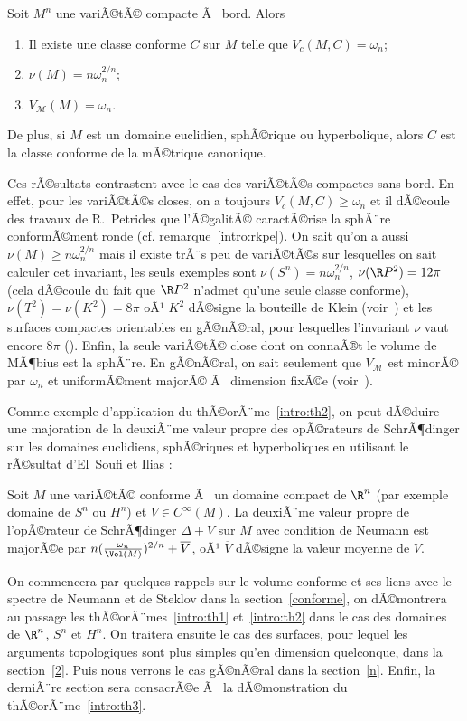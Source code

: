 \documentclass[11pt,a4paper]{smfart}
\begin{document}
\begin{theo}\label{intro:th2}
Soit $M^n$ une variÃ©tÃ© compacte Ã  bord. Alors
\begin{enumerate}
\item Il existe une classe conforme $C$ sur $M$ telle que $V_c(M,C)=\omega_n$;
\item $\nu(M)=n\omega_n^{2/n}$;
\item $V_\mathcal{M}(M)=\omega_n$.
\end{enumerate}
De plus, si $M$ est un domaine euclidien, sphÃ©rique ou hyperbolique, alors
$C$ est la classe conforme de la mÃ©trique canonique.
\end{theo}
Ces rÃ©sultats contrastent avec le cas des variÃ©tÃ©s compactes sans bord.
En effet, pour les variÃ©tÃ©s closes, on a toujours $V_c(M,C)\geq\omega_n$
et il dÃ©coule des travaux de R.~Petrides  que l'Ã©galitÃ© caractÃ©rise la sphÃ¨re
conformÃ©ment ronde (cf. remarque~\ref{intro:rkpe}).
On sait qu'on a aussi $\nu(M)\geq n\omega_n^{2/n}$ mais il existe trÃ¨s
peu de variÃ©tÃ©s sur lesquelles on sait calculer cet invariant, les
seuls exemples sont $\nu(S^n)=n\omega_n^{2/n}$, $\nu(\R P^2)=12\pi$
(cela dÃ©coule du fait que $\R P^2$ n'admet qu'une seule classe conforme),
 $\nu(T^2)=\nu(K^2)=8\pi$ oÃ¹ $K^2$ dÃ©signe la bouteille de Klein
(voir~\cite{gi09}) et les surfaces compactes orientables en gÃ©nÃ©ral, pour
lesquelles l'invariant $\nu$ vaut encore $8\pi$
(\cite{pe14}). Enfin, la seule variÃ©tÃ© close dont on connaÃ®t le
volume de MÃ¶bius est la sphÃ¨re. En gÃ©nÃ©ral, on sait seulement que
$V_\mathcal{M}$ est minorÃ© par $\omega_n$ et uniformÃ©ment majorÃ© Ã  dimension
fixÃ©e (voir~\cite{ja08}).

Comme exemple d'application du thÃ©orÃ¨me~\ref{intro:th2},
on peut dÃ©duire une majoration de la deuxiÃ¨me valeur propre des
opÃ©rateurs de SchrÃ¶dinger sur les domaines euclidiens, sphÃ©riques et
hyperboliques en utilisant le rÃ©sultat d'El~Soufi et Ilias \cite{esi92}:

\begin{cor}\label{intro:cor1}
Soit $M$ une variÃ©tÃ© conforme Ã  un domaine compact de $\R^n$ (par exemple
domaine de $S^n$ ou $H^n$) et $V\in C^\infty(M)$.
La deuxiÃ¨me valeur propre de l'opÃ©rateur de SchrÃ¶dinger $\Delta+V$
sur $M$ avec condition de Neumann est majorÃ©e par
$n(\frac{\omega_n}{\Vol(M)})^{2/n}+\overline V$,
oÃ¹ $\overline V$ dÃ©signe la valeur moyenne de $V$.
\end{cor}

 On commencera par quelques rappels sur le volume conforme et ses
liens avec le spectre de Neumann et de Steklov dans la
section~\ref{conforme}, on dÃ©montrera au passage les
thÃ©orÃ¨mes~\ref{intro:th1} et~\ref{intro:th2} dans le cas des domaines
de $\R^n$, $S^n$ et $H^n$.
On traitera ensuite le cas des surfaces,
pour lequel les arguments topologiques sont plus simples qu'en dimension
quelconque, dans la
section~\ref{2}. Puis nous verrons le cas gÃ©nÃ©ral dans la section~\ref{n}.
Enfin, la derniÃ¨re section sera consacrÃ©e Ã  la dÃ©monstration
du thÃ©orÃ¨me~\ref{intro:th3}.
\end{document}
